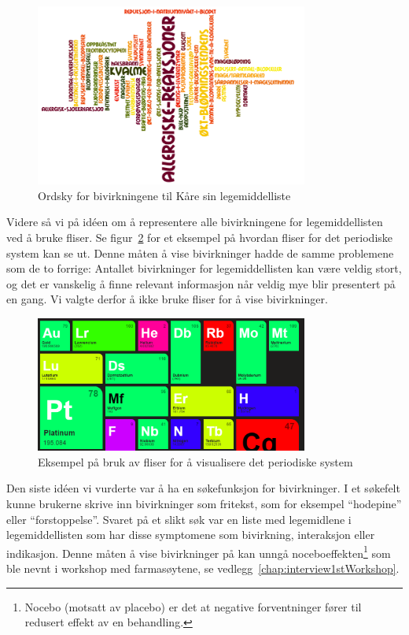 \begin{figure}[H]
    \centering
    \includegraphics[width=0.8\textwidth]{fig/utviklingAvPrototype/ordsky.PNG}
    \caption{Ordsky for bivirkningene til Kåre sin legemiddelliste}
    \label{fig:ordsky}
\end{figure} 

Videre så vi på idéen om å representere alle bivirkningene for legemiddellisten ved å bruke fliser. Se figur~\ref{fig:tiles} for et eksempel på hvordan fliser for det periodiske system kan se ut. Denne måten å vise bivirkninger hadde de samme problemene som de to forrige: Antallet bivirkninger for legemiddellisten kan være veldig stort, og det er vanskelig å finne relevant informasjon når veldig mye blir presentert på en gang. Vi valgte derfor å ikke bruke fliser for å vise bivirkninger.

\begin{figure}[H]
    \centering
    \includegraphics[width=0.8\textwidth]{fig/utviklingAvPrototype/tiles.PNG}
    \caption{Eksempel på bruk av fliser for å visualisere det periodiske system}
    \label{fig:tiles}
\end{figure} 

Den siste idéen vi vurderte var å ha en søkefunksjon for bivirkninger. I et søkefelt kunne brukerne skrive inn bivirkninger som fritekst, som for eksempel “hodepine” eller “forstoppelse”. Svaret på et slikt søk var en liste med legemidlene i legemiddellisten som har disse symptomene som bivirkning, interaksjon eller indikasjon. Denne måten å vise bivirkninger på kan unngå noceboeffekten\footnote{Nocebo (motsatt av placebo) er det at negative forventninger fører til redusert effekt av en behandling.} som ble nevnt i workshop med farmasøytene, se vedlegg~\ref{chap:interview1stWorkshop}.


